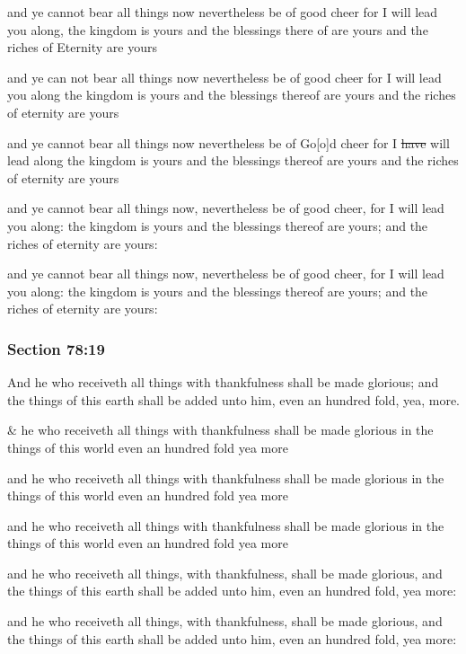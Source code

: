 		\begin{framed}
		\scriptsize
			\begin{compactdesc}
				\item[JSP] and ye cannot bear all things now nevertheless be of good cheer for I will lead you along, the kingdom is yours and the blessings there of are yours and the riches of Eternity are yours
				\item[RB1] and ye can not bear all things now nevertheless be of good cheer for I will lead you along the kingdom is yours and the blessings thereof are yours and the riches of eternity are yours
				\item[RB2] and ye cannot bear all things now nevertheless be of Go[o]d cheer for I \sout{have} will lead along the kingdom is yours and the blessings thereof are yours and the riches of eternity are yours
				\item[DC 1835] and ye cannot bear all things now, nevertheless be of good cheer, for I will lead you along: the kingdom is yours and the blessings thereof are yours; and the riches of eternity are yours:
				\item[DC 1844] and ye cannot bear all things now, nevertheless be of good cheer, for I will lead you along: the kingdom is yours and the blessings thereof are yours; and the riches of eternity are yours:
			\end{compactdesc}
		\end{framed}

	\subsubsection{Section 78:19} %
		\label{DC78-19}

		And he who receiveth all things with thankfulness shall be made glorious; and the things of this earth shall be added unto him, even an hundred fold, yea, more.

		\begin{framed}
		\scriptsize
			\begin{compactdesc}
				\item[JSP] \& he who receiveth all things with thankfulness shall be made glorious in the things of this world even an hundred fold yea more
				\item[RB1] and he who receiveth all things with thankfulness shall be made glorious in the things of this world even an hundred fold yea more
				\item[RB2] and he who receiveth all things with thankfulness shall be made glorious in the things of this world even an hundred fold yea more
				\item[DC 1835] and he who receiveth all things, with thankfulness, shall be made glorious, and the things of this earth shall be added unto him, even an hundred fold, yea more:
				\item[DC 1844] and he who receiveth all things, with thankfulness, shall be made glorious, and the things of this earth shall be added unto him, even an hundred fold, yea more:
			\end{compactdesc}
		\end{framed}

